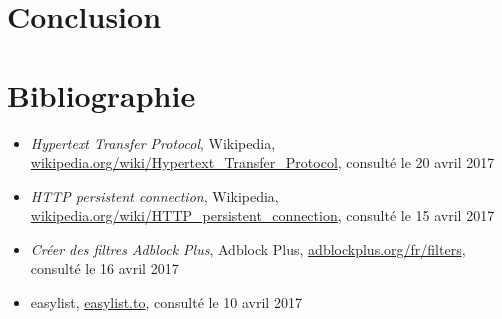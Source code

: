 \documentclass[a4paper,11pt, oneside]{book}
\begin{document}
			\chapter{Conclusion}


			\chapter{Bibliographie}
			\begin{itemize}
				\item \textit{Hypertext Transfer Protocol}, Wikipedia, \\\href{https://en.wikipedia.org/wiki/Hypertext\_Transfer\_Protocol}
				{wikipedia.org/wiki/Hypertext\_Transfer\_Protocol}, consulté le 20 avril 2017

				\item \textit{HTTP persistent connection}, Wikipedia, \\\href{https://en.wikipedia.org/wiki/HTTP\_persistent\_connection}
				{wikipedia.org/wiki/HTTP\_persistent\_connection}, consulté le 15 avril 2017

				\item \textit{Créer des filtres Adblock Plus}, Adblock Plus, \href{https://adblockplus.org/fr/filters}{adblockplus.org/fr/filters}, consulté le 16 avril 2017
				\item easylist, \href{https://easylist.to/}{easylist.to}, consulté le 10 avril 2017
			\end{itemize}
\end{document}
